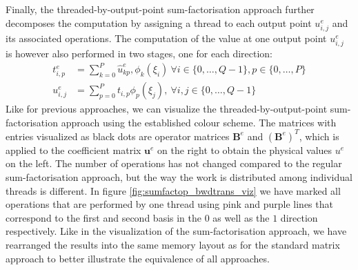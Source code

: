 %
Finally, the threaded-by-output-point sum-factorisation approach further decomposes the computation by assigning a thread to each output point $u^e_{i,j}$ and its associated operations.
The computation of the value at one output point $u^e_{i,j}$ is however also performed in two stages, one for each direction:
\begin{align*}
  t_{i,p}^e &= \sum_{k=0}^P \hat{u}_{kp}^e,\phi_k(\xi_i) \ \forall i \in \{0,\ldots, Q-1 \}, p \in \{0, \ldots, P \} \\
  u^e_{i,j} &= \sum_{p=0}^P t_{i,p} \phi_p(\xi_j), \ \forall i,j \in \{0,\ldots, Q-1 \}
\end{align*}
Like for previous approaches, we can visualize the threaded-by-output-point sum-factorisation approach using the established colour scheme. 
The matrices with entries visualized as black dots are operator matrices $\mathbf{B}^e$ and $(\mathbf{B}^e)^T$, which is applied to the coefficient matrix $\mathbf{u}^e$ on the right to obtain the physical values $u^e$ on the left.
The number of operations has not changed compared to the regular sum-factorisation approach, but the way the work is distributed among individual threads is different. In figure \ref{fig:sumfactop_bwdtrans_viz} we have marked all operations that are performed by one thread using pink and purple lines that correspond to the first and second basis in the $0$ as well as the $1$ direction respectively.
Like in the visualization of the sum-factorisation approach, we have rearranged the results into the same memory layout as for the standard matrix approach to better illustrate the equivalence of all approaches.

